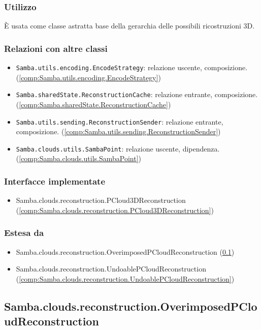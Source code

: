 \subsubsection{Utilizzo}
È usata come classe astratta base della gerarchia delle possibili ricostruzioni 3D.
\subsubsection{Relazioni con altre classi}
\begin{itemize}
	\item \texttt{Samba.utils.encoding.EncodeStrategy}: relazione uscente, composizione. (\ref{comp:Samba.utils.encoding.EncodeStrategy})
	\item \texttt{Samba.sharedState.ReconstructionCache}: relazione entrante, composizione. (\ref{comp:Samba.sharedState.ReconstructionCache})
	\item \texttt{Samba.utils.sending.ReconstructionSender}: relazione entrante, composizione. (\ref{comp:Samba.utils.sending.ReconstructionSender})
	\item \texttt{Samba.clouds.utils.SambaPoint}: relazione uscente, dipendenza. (\ref{comp:Samba.clouds.utils.SambaPoint})
\end{itemize}
\subsubsection{Interfacce implementate}
\begin{itemize}
	\item Samba.clouds.reconstruction.PCloud3DReconstruction (\ref{comp:Samba.clouds.reconstruction.PCloud3DReconstruction})
\end{itemize}
\subsubsection{Estesa da}
\begin{itemize}
	\item Samba.clouds.reconstruction.OverimposedPCloudReconstruction (\ref{comp:Samba.clouds.reconstruction.OverimposedPCloudReconstruction})
	\item Samba.clouds.reconstruction.UndoablePCloudReconstruction (\ref{comp:Samba.clouds.reconstruction.UndoablePCloudReconstruction})
\end{itemize}

\subsection{Samba.clouds.reconstruction.OverimposedPCloudReconstruction}\label{comp:Samba.clouds.reconstruction.OverimposedPCloudReconstruction}
